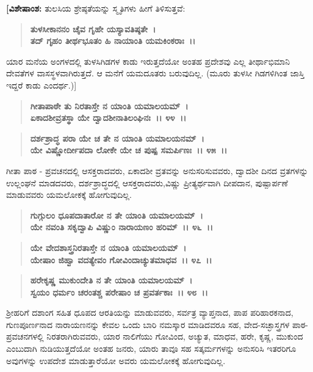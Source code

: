 \textbf{[ವಿಶೇಷಾಂಶ:} ತುಲಸಿಯ ಶ್ರೇಷ್ಠತೆಯನ್ನು ಸ್ಮೃತಿಗಳು ಹೀಗೆ ತಿಳಿಸುತ್ತವೆ:

\begin{verse}
\textbf{ತುಳಸೀಕಾನನಂ ಚೈವ ಗೃಹೇ ಯಸ್ಯಾವತಿಷ್ಠತೇ~।}\\\textbf{ತದ್ ಗೃಹಂ ತೀರ್ಥಭೂತಂ ಹಿ ನಾಯಾಂತಿ ಯಮಕಿಂಕರಾಃ~।।}
\end{verse}

ಯಾರ ಮನೆಯ ಅಂಗಳದಲ್ಲಿ ತುಳಸಿಗಿಡಗಳ ಕಾಡು ಇರುತ್ತದೆಯೋ ಅಂತಹ ಪ್ರದೇಶವು ಎಲ್ಲ ತೀರ್ಥಾಭಿಮಾನಿ ದೇವತೆಗಳ ವಾಸಸ್ಥಳವಾಗಿರುತ್ತದೆ. ಆ ಮನೆಗೆ ಯಮದೂತರು ಬರುವುದಿಲ್ಲ. (ಮೂರು ತುಳಸೀ ಗಿಡಗಳಿಗಿಂತ ಜಾಸ್ತಿ ಇದ್ದರೆ ಕಾಡು ಎಂದರ್ಥ.)]

\begin{verse}
\textbf{ಗೀತಾಪಾಠೇ ತು ನಿರತಾಸ್ತೇ ನ ಯಾಂತಿ ಯಮಾಲಯಮ್~।}\\\textbf{ಏಕಾದಶೀವ್ರತಸ್ಥಾ ಯೇ ದ್ವಾದಶೀನಾತಿಲಂಘಿನಃ~।। ೪೪~।।} 
\end{verse}

\begin{verse}
\textbf{ದರ್ಶಶ್ರಾದ್ಧ ಪರಾ ಯೇ ಚ ತೇ ನ ಯಾಂತಿ ಯಮಾಲಯನಮ್~।}\\\textbf{ಯೇ ವಿಷ್ಣೋರ್ದೀಪದಾ ಲೋಕೇ ಯೇ ಚ ಪುಷ್ಪ ಸಮರ್ಪಿಣಃ~।। ೪೫~।। }
\end{verse}

ಗೀತಾ ಪಾಠ - ಪ್ರವಚನದಲ್ಲಿ ಆಸಕ್ತರಾದವರು, ಏಕಾದಶೀ ವ್ರತವನ್ನು ಅನುಸರಿಸುವವರು, ದ್ವಾದಶೀ ದಿನದ ವ್ರತಗಳನ್ನು ಉಲ್ಲಂಘನೆ ಮಾಡದವರು, ದರ್ಶಶ್ರಾದ್ಧದಲ್ಲಿ ಆಸಕ್ತರಾದವರು,ವಿಷ್ಣು ಪ್ರೀತ್ಯರ್ಥವಾಗಿ ದೀಪದಾನ, ಪುಷ್ಪಾರ್ಪಣೆ ಮಾಡುವವರು ಯಮಲೋಕಕ್ಕೆ ಹೋಗುವುದಿಲ್ಲ.

\begin{verse}
\textbf{ಗುಗ್ಗುಲಂ ಧೂಪದಾತಾರೋ ನ ತೇ ಯಾಂತಿ ಯಮಾಲಯಮ್~।}\\\textbf{ಯೇ ನವಂತಿ ಸಕೃದ್ವಾಪಿ ವಿಷ್ಣುಂ ನಾರಾಯಣಂ ಹರಿಮ್~।। ೪೬~।। }
\end{verse}

\begin{verse}
\textbf{ಯೇ ವೇದಶಾಸ್ತ್ರನಿರತಾಸ್ತೇ ನ ಯಾಂತಿ ಯಮಾಲಯಮ್~।}\\\textbf{ಯೇಷಾಂ ಜಿಹ್ವಾ ವದತ್ಯೇವಂ ಗೋವಿಂದಾಚ್ಯುತಮಾಧವ~।। ೪೭~।।}
\end{verse}

\begin{verse}
\textbf{ಹರೇಕೃಷ್ಣ ಮುಕುಂದೇತಿ ನ ತೇ ಯಾಂತಿ ಯಮಾಲಯಮ್~।}\\\textbf{ಸ್ವಯಂ ಧರ್ಮಂ ಚರಂತಶ್ಚ ಪರೇಷಾಂ ಚ ಪ್ರವರ್ತಕಾಃ~।। ೪೮~।।}
\end{verse}

ಶ‍್ರೀಹರಿಗೆ ದಶಾಂಗ ಸಹಿತ ಧೂಪದ ಆರತಿಯನ್ನು ಮಾಡುವವರು, ಸರ್ವತ್ರ ವ್ಯಾಪ್ತನಾದ, ಪಾಪ ಪರಿಹಾರಕನಾದ, ಗುಣಪೂರ್ಣನಾದ ನಾರಾಯಣನನ್ನು ಕೇವಲ ಒಂದು ಬಾರಿ ನಮಸ್ಕಾರ ಮಾಡಿದವರೂ ಸಹ, ವೇದ-ಸಚ್ಛಾಸ್ತ್ರಗಳ ಪಾಠ-ಪ್ರವಚನಗಳಲ್ಲಿ ನಿರತರಾಗಿರುವವರು, ಯಾರ ನಾಲಿಗೆಯು ಗೋವಿಂದ, ಅಚ್ಯುತ, ಮಾಧವ, ಹರೇ, ಕೃಷ್ಣ, ಮುಕುಂದ ಎಂಬುದಾಗಿ ನುಡಿಯುತ್ತದೆಯೋ ಅಂತಹ ಜನರು, ಯಾರು ತಾವೂ ಸಹ ಸತ್ಕರ್ಮಗಳನ್ನು ಅನುಸರಿಸಿ ಇತರರಿಗೂ ಅವುಗಳನ್ನು ಉಪದೇಶ ಮಾಡುತ್ತಾರೆಯೋ ಅವರು ಯಮಲೋಕಕ್ಕೆ ಹೋಗುವುದಿಲ್ಲ.


